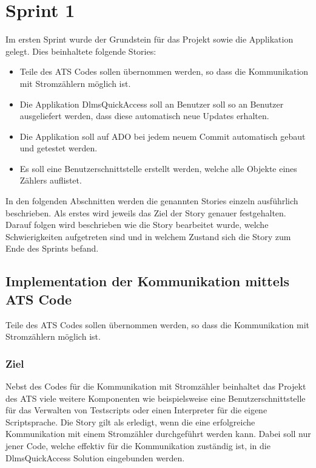 \section{Sprint 1}
Im ersten Sprint wurde der Grundstein für das Projekt sowie die Applikation gelegt.
Dies beinhaltete folgende Stories:
\begin{itemize}
   \item Teile des \ac{ATS} Codes sollen übernommen werden, so dass die Kommunikation mit Stromzählern möglich ist.
   \item Die Applikation DlmsQuickAccess soll an Benutzer soll so an Benutzer ausgeliefert werden, dass diese automatisch neue Updates erhalten.
   \item Die Applikation soll auf \ac{ADO} bei jedem neuem Commit automatisch gebaut und getestet werden. 
   \item Es soll eine Benutzerschnittstelle erstellt werden, welche alle Objekte eines Zählers auflistet.
\end{itemize}
In den folgenden Abschnitten werden die genannten Stories einzeln ausführlich beschrieben.
Als erstes wird jeweils das Ziel der Story genauer festgehalten.
Darauf folgen wird beschrieben wie die Story bearbeitet wurde, welche Schwierigkeiten aufgetreten sind und in welchem Zustand sich die Story zum Ende des Sprints befand.

\subsection{Implementation der Kommunikation mittels ATS Code}\label{s1:ats}
\dq Teile des \ac{ATS} Codes sollen übernommen werden, so dass die Kommunikation mit Stromzählern möglich ist.\dq

\subsubsection{Ziel}
Nebst des Codes für die Kommunikation mit Stromzähler beinhaltet das Projekt des \ac{ATS} viele weitere Komponenten wie beispielsweise eine Benutzerschnittstelle für das Verwalten von Testscripts oder einen Interpreter für die eigene Scriptsprache.
Die Story gilt als erledigt, wenn die eine erfolgreiche Kommunikation mit einem Stromzähler durchgeführt werden kann.
Dabei soll nur jener Code, welche effektiv für die Kommunikation zuständig ist, in die DlmsQuickAccess Solution eingebunden werden. 


